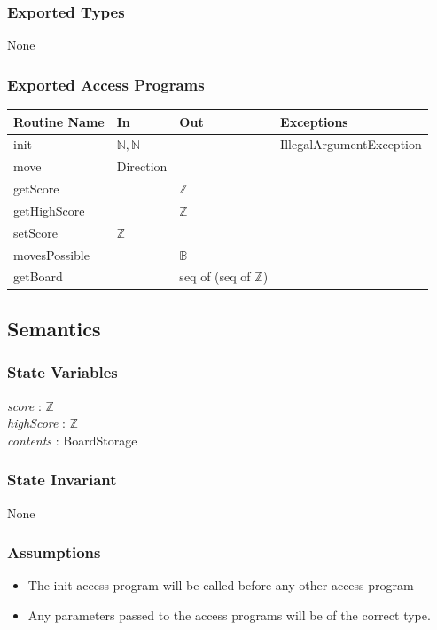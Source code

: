 \documentclass{article}
\begin{document}
		\subsubsection*{Exported Types}
			None

		\subsubsection*{Exported Access Programs}
			\begin{tabular}{|l|l|l|p{5cm}|}
				\hline
				\textbf{Routine Name} & \textbf{In} & \textbf{Out} & \textbf{Exceptions} \\
				\hline
				init & $\mathbb{N}, \mathbb{N}$ & & IllegalArgumentException \\
				\hline
				move & Direction & & \\
				\hline
				getScore & & $\mathbb{Z}$ & \\
				\hline
				getHighScore & & $\mathbb{Z}$ & \\
				\hline
				setScore & $\mathbb{Z}$ & & \\
				\hline
				movesPossible & & $\mathbb{B}$ & \\
				\hline
				getBoard & & seq of (seq of $\mathbb{Z}$) & \\
				\hline
			\end{tabular}

	\subsection*{Semantics}

		\subsubsection*{State Variables}
			\textit{score} : $\mathbb{Z}$\\
			\textit{highScore} : $\mathbb{Z}$\\
			\textit{contents} : BoardStorage

		\subsubsection*{State Invariant}
			None

		\subsubsection*{Assumptions}
			\begin{itemize}
				\item The init access program will be called before any other access program
				\item Any parameters passed to the access programs will be of the correct type.
			\end{itemize}
\end{document}
